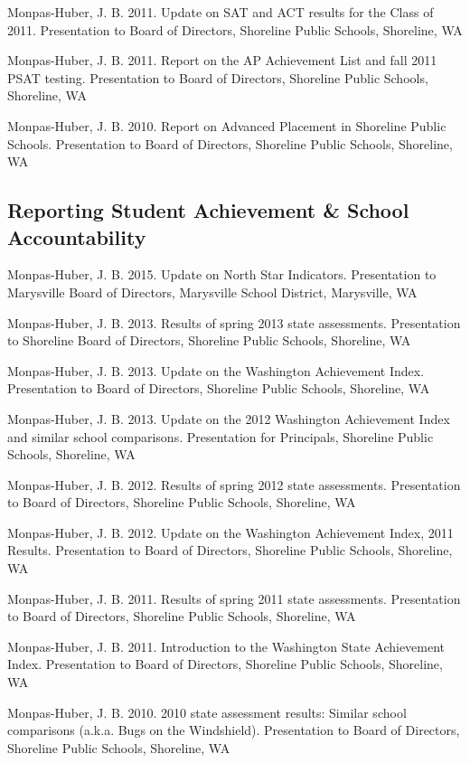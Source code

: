 \documentclass[
  letterpaper,
]{article}
\begin{document}
Monpas-Huber, J. B. 2011. Update on SAT and ACT results for the Class of
2011. Presentation to Board of Directors, Shoreline Public Schools,
Shoreline, WA

Monpas-Huber, J. B. 2011. Report on the AP Achievement List and fall
2011 PSAT testing. Presentation to Board of Directors, Shoreline Public
Schools, Shoreline, WA

Monpas-Huber, J. B. 2010. Report on Advanced Placement in Shoreline
Public Schools. Presentation to Board of Directors, Shoreline Public
Schools, Shoreline, WA

\subsection{Reporting Student Achievement \& School
Accountability}\label{reporting-student-achievement-school-accountability}

Monpas-Huber, J. B. 2015. Update on North Star Indicators. Presentation
to Marysville Board of Directors, Marysville School District,
Marysville, WA

Monpas-Huber, J. B. 2013. Results of spring 2013 state assessments.
Presentation to Shoreline Board of Directors, Shoreline Public Schools,
Shoreline, WA

Monpas-Huber, J. B. 2013. Update on the Washington Achievement Index.
Presentation to Board of Directors, Shoreline Public Schools, Shoreline,
WA

Monpas-Huber, J. B. 2013. Update on the 2012 Washington Achievement
Index and similar school comparisons. Presentation for Principals,
Shoreline Public Schools, Shoreline, WA

Monpas-Huber, J. B. 2012. Results of spring 2012 state assessments.
Presentation to Board of Directors, Shoreline Public Schools, Shoreline,
WA

Monpas-Huber, J. B. 2012. Update on the Washington Achievement Index,
2011 Results. Presentation to Board of Directors, Shoreline Public
Schools, Shoreline, WA

Monpas-Huber, J. B. 2011. Results of spring 2011 state assessments.
Presentation to Board of Directors, Shoreline Public Schools, Shoreline,
WA

Monpas-Huber, J. B. 2011. Introduction to the Washington State
Achievement Index. Presentation to Board of Directors, Shoreline Public
Schools, Shoreline, WA

Monpas-Huber, J. B. 2010. 2010 state assessment results: Similar school
comparisons (a.k.a. Bugs on the Windshield). Presentation to Board of
Directors, Shoreline Public Schools, Shoreline, WA
\end{document}
